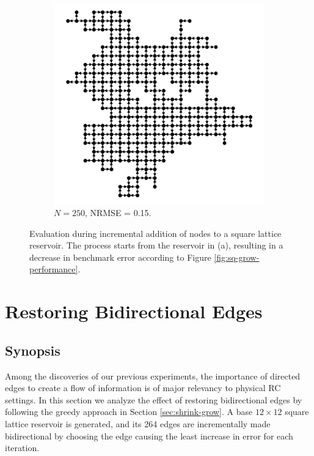 \begin{figure}[htb]
\begin{subfigure}{.49\textwidth}
\includegraphics[width=1.0\linewidth]{figures/sq-grid-grow-250.png}
    \caption{$N = 250$, NRMSE = 0.15.}
    \label{fig:sq-grid-grow-250}
  \end{subfigure}
  \caption{
    Evaluation during incremental addition of nodes to a square lattice
reservoir. The process starts from the reservoir in (a), resulting in a decrease
in benchmark error according to Figure \protect\ref{fig:sq-grow-performance}.
  }
  \label{fig:sq-grid-grow}
\end{figure}

\section{Restoring Bidirectional Edges}

\subsection{Synopsis}

Among the discoveries of our previous experiments, the importance of directed
edges to create a flow of information is of major relevancy to physical RC
settings. In this section we analyze the effect of restoring bidirectional edges
by following the greedy approach in Section \ref{sec:shrink-grow}. A base $12
\times 12$ square lattice reservoir is generated, and its 264 edges are
incrementally made bidirectional by choosing the edge causing the least increase
in error for each iteration.

